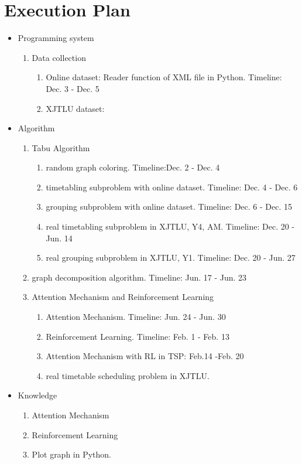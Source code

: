 \documentclass{article}
\begin{document}
\section{Execution Plan}
\label{sec: Execution Plan}

\begin{itemize}
	\item Programming system
	      \begin{enumerate}
		      \item Data collection
		            \begin{enumerate}
			            \item Online dataset: Reader function of XML file in Python. Timeline: Dec. 3 - Dec. 5
			            \item XJTLU dataset:
		            \end{enumerate}
	      \end{enumerate}
	\item Algorithm
	      \begin{enumerate}
		      \item Tabu Algorithm
		            \begin{enumerate}
			            \item random graph coloring. Timeline:Dec. 2 - Dec. 4
			            \item timetabling subproblem with online dataset. Timeline: Dec. 4 - Dec. 6
			            \item grouping subproblem with online dataset. Timeline: Dec. 6 - Dec. 15
			            \item real timetabling subproblem in XJTLU, Y4, AM. Timeline: Dec. 20 - Jun. 14
			            \item real grouping subproblem in XJTLU, Y1. Timeline: Dec. 20 - Jun. 27
		            \end{enumerate}
		      \item graph decomposition algorithm. Timeline: Jun. 17 - Jun. 23
		      \item Attention Mechanism and  Reinforcement Learning
		            \begin{enumerate}
			            \item Attention Mechanism. Timeline: Jun. 24 - Jun. 30
			            \item Reinforcement Learning. Timeline: Feb. 1 - Feb. 13
			            \item Attention Mechanism with RL in TSP: Feb.14 -Feb. 20
			            \item real timetable scheduling problem in XJTLU.
		            \end{enumerate}
	      \end{enumerate}
	\item Knowledge
	      \begin{enumerate}
		      \item Attention Mechanism
		      \item Reinforcement Learning
		      \item Plot graph in Python.
	      \end{enumerate}
\end{itemize}




\end{document}
